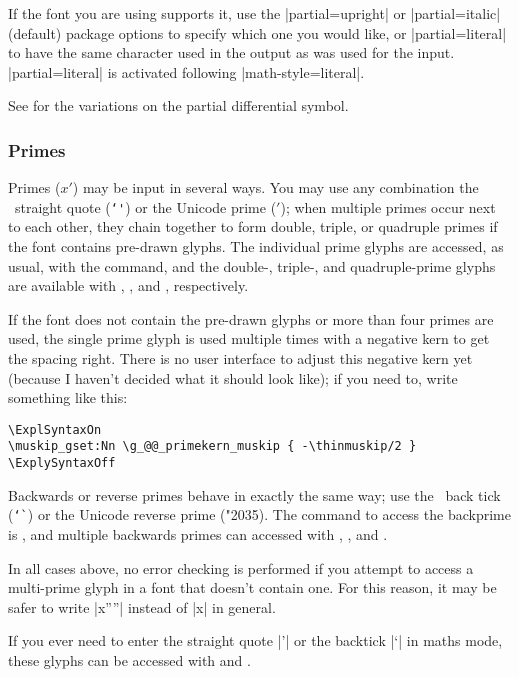 If the font you are using supports it, use the |partial=upright| or |partial=italic| (default) package options to specify
which one you would like, or |partial=literal| to have the same character
used in the output as was used for the input.
|partial=literal| is activated following |math-style=literal|.

See  for the variations on the partial differential symbol.


\subsubsection{Primes}

Primes ($x'$) may be input in several ways. You may use any combination
the \ascii\ straight quote (\texttt{\char`\'}) or the Unicode prime 
($'$); when multiple primes occur next to each other, they chain
together to form double, triple, or quadruple primes if the font contains
pre-drawn glyphs. The individual prime glyphs are accessed, as usual,
with the  command, and the double-, triple-, and quadruple-prime
glyphs are available with , , and ,
respectively.

If the font does not contain the pre-drawn glyphs or more than four primes
are used, the single prime glyph is used multiple times with a negative
kern to get the spacing right. There is no user interface to adjust this
negative kern yet (because I haven't decided what it should look like);
if you need to, write something like this:
\begin{Verbatim}
\ExplSyntaxOn
\muskip_gset:Nn \g_@@_primekern_muskip { -\thinmuskip/2 }
\ExplySyntaxOff
\end{Verbatim}
Backwards or reverse primes behave in exactly the same way; use the \ascii\
back tick (\texttt{\char`\`}) or the Unicode reverse prime 
({\umfont\char"2035}).
The command to access the backprime is , and
multiple backwards primes can accessed with ,
, and .

In all cases above, no error checking is performed if you attempt to
access a multi-prime glyph in a font that doesn't contain one. For this
reason, it may be safer to write |x''''| instead of |x\qprime|
in general.

If you ever need to enter the straight quote |'| or the backtick |`| in
maths mode, these glyphs can be accessed with \cs{mathstraightquote} and
\cs{mathbacktick}.


